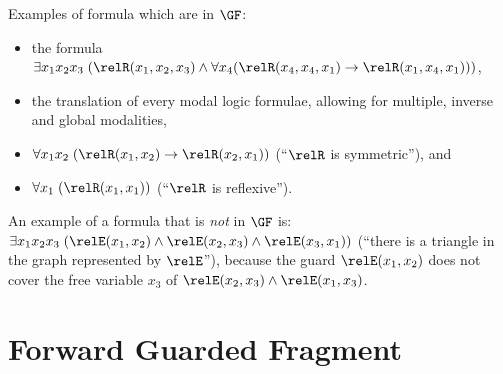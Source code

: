 \begin{example}
  Examples of formula which are in $\GF$:
  \begin{itemize}
    \item the formula $\exists{x_{1}x_{2}x_{3}}\; (\relR(x_{1}, x_{2}, x_{3}) \land \forall x_{4}(\relR(x_{4}, x_{4}, x_{1}) \to \relR(x_{1}, x_{4}, x_{1})))$,
    \item the translation of every modal logic formulae, allowing for multiple, inverse and global modalities,
    \item $\forall{x_{1}x_{2}}\; (\relR(x_{1},x_{2}) \to \relR(x_{2},x_{1}))$ (``$\relR$ is symmetric''), and
    \item $\forall{x_{1}}\; (\relR(x_{1},x_{1}))$ (``$\relR$ is reflexive'').
  \end{itemize}
\end{example}
\begin{example}
  An example of a formula that is \emph{not} in $\GF$ is: $\exists{x_{1}x_{2}x_{3}}\; (\relE(x_{1}, x_{2}) \land \relE(x_{2}, x_{3}) \land \relE(x_{3}, x_{1}))$ (``there is a triangle in the graph represented by $\relE$''), because the guard $\relE(x_{1}, x_{2})$ does not cover the free variable $x_{3}$ of $\relE(x_{2},x_{3}) \land \relE(x_{1}, x_{3})$.
\end{example}

\section{Forward Guarded Fragment}

